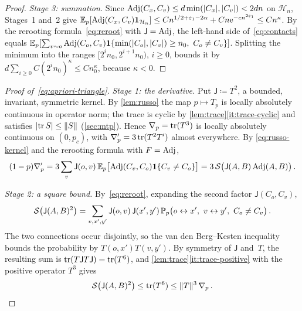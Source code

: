 \begin{proof}
\emph{Stage 3: summation.} Since $\operatorname{Adj}(C_x,C_v)\le d\min(\lvert C_x\rvert,\lvert C_v\rvert)<2dn$ on $\mathcal H_n$,
Stages~1 and~2 give
$\mathbb E_p[\operatorname{Adj}(C_x,C_v)\mathbf{1}_{\mathcal H_n}]\le Cn^{1/2+\varepsilon_1-2\alpha}+Cn\mathrm{e}^{-cn^{2\varepsilon_1}}
\le Cn^\kappa$. By the rerooting formula~\eqref{eq:reroot} with $\mathsf J=\operatorname{Adj}$, the left-hand side
of~\eqref{eq:contacts} equals
$\mathbb E_p[\sum_{v\sim o}\operatorname{Adj}(C_o,C_v)\mathbf{1}\{\min(\lvert C_o\rvert,\lvert C_v\rvert)\ge n_0,\ C_o\neq C_v\}]$. Splitting the
minimum into the ranges $[2^in_0,2^{i+1}n_0)$, $i\ge0$, bounds it by $d\sum_{i\ge0}C(2^in_0)^\kappa\le
Cn_0^\kappa$, because $\kappa<0$.
\end{proof}

\begin{proof}[Proof of~\eqref{eq:apriori-triangle}]
\emph{Stage 1: the derivative.} Put $\mathsf J\coloneqq T^2$, a bounded, invariant, symmetric kernel. By
\cref{lem:russo} the map $p\mapsto T_p$ is locally absolutely continuous in operator norm; the trace is
cyclic by \cref{lem:trace}\ref{it:trace-cyclic} and satisfies $\lvert\operatorname{tr} S\rvert\le\lVert S\rVert$
(\cref{sec:mtp}). Hence $\nabla_p=\operatorname{tr}(T^3)$ is
locally absolutely continuous on $(0,p_c)$, with $\nabla_p'=3\operatorname{tr}(T^2T')$ almost everywhere. By
\eqref{eq:russo-kernel} and the rerooting formula with $F=\operatorname{Adj}$,
\begin{equation}\label{eq:triangle-derivative}
  (1-p)\nabla_p'=3\sum_v\mathsf J(o,v)\,\mathbb E_p\bigl[\operatorname{Adj}(C_v,C_o)\mathbf{1}\{C_v\neq C_o\}\bigr]
  =3\,\mathcal S\bigl(\mathsf J(A,B)\operatorname{Adj}(A,B)\bigr)\,.
\end{equation}

\emph{Stage 2: a square bound.} By~\eqref{eq:reroot}, expanding the second factor $\mathsf J(C_o,C_v)$,
\begin{equation*}
  \mathcal S\bigl(\mathsf J(A,B)^2\bigr)=\sum_{v,x',y'}\mathsf J(o,v)\,\mathsf J(x',y')\,
  \mathbb P_p\bigl(o\leftrightarrow x',\ v\leftrightarrow y',\ C_o\neq C_v\bigr)\,.
\end{equation*}
The two connections occur disjointly, so the van den Berg--Kesten inequality bounds the probability by
$T(o,x')T(v,y')$. By symmetry of $\mathsf J$ and~$T$, the resulting sum is $\operatorname{tr}(T\mathsf J T\mathsf J)=\operatorname{tr}(T^6)$, and
\cref{lem:trace}\ref{it:trace-positive} with the positive operator $T^3$ gives
\begin{equation}\label{eq:square-bound}
  \mathcal S\bigl(\mathsf J(A,B)^2\bigr)\le\operatorname{tr}(T^6)\le\lVert T\rVert^3\,\nabla_p\,.
\end{equation}


\end{proof}
